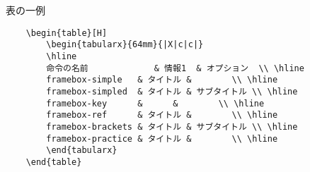 \begin{multicols*}{2}
\begin{framebox-ref}{表の一例}
{\selectsize{6pt}{7pt}
\begin{verbatim}
    \begin{table}[H]
        \begin{tabularx}{64mm}{|X|c|c|}
        \hline
        命令の名前             & 情報1  & オプション  \\ \hline
        framebox-simple   & タイトル &        \\ \hline
        framebox-simpled  & タイトル & サブタイトル \\ \hline
        framebox-key      &      &        \\ \hline
        framebox-ref      & タイトル &        \\ \hline
        framebox-brackets & タイトル & サブタイトル \\ \hline
        framebox-practice & タイトル &        \\ \hline
        \end{tabularx}
    \end{table}
\end{verbatim}
}
\end{framebox-ref}


\end{multicols*}
